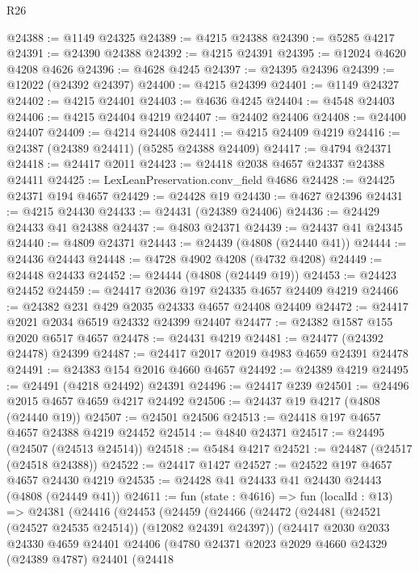 \begin{lexlean}{R26}
\begin{coremodule}
@24388 := @1149 @24325
@24389 := @4215 @24388
@24390 := @5285 @4217
@24391 := @24390 @24388
@24392 := @4215 @24391
@24395 := @12024 @4620 @4208 @4626
@24396 := @4628 @4245
@24397 := @24395 @24396
@24399 := @12022 (@24392 @24397)
@24400 := @4215 @24399
@24401 := @1149 @24327
@24402 := @4215 @24401
@24403 := @4636 @4245
@24404 := @4548 @24403
@24406 := @4215 @24404 @4219
@24407 := @24402 @24406
@24408 := @24400 @24407
@24409 := @4214 @24408
@24411 := @4215 @24409 @4219
@24416 := @24387 (@24389 @24411) (@5285 @24388 @24409)
@24417 := @4794 @24371
@24418 := @24417 @2011
@24423 := @24418 @2038 @4657 @24337 @24388 @24411
@24425 := LexLeanPreservation.conv_field @4686
@24428 := @24425 @24371 @194 @4657
@24429 := @24428 @19
@24430 := @4627 @24396
@24431 := @4215 @24430
@24433 := @24431 (@24389 @24406)
@24436 := @24429 @24433 @41 @24388
@24437 := @4803 @24371
@24439 := @24437 @41 @24345
@24440 := @4809 @24371
@24443 := @24439 (@4808 (@24440 @41))
@24444 := @24436 @24443
@24448 := @4728 @4902 @4208 (@4732 @4208)
@24449 := @24448 @24433
@24452 := @24444 (@4808 (@24449 @19))
@24453 := @24423 @24452
@24459 := @24417 @2036 @197 @24335 @4657 @24409 @4219
@24466 := @24382 @231 @429 @2035 @24333 @4657 @24408 @24409
@24472 := @24417 @2021 @2034 @6519 @24332 @24399 @24407
@24477 := @24382 @1587 @155 @2020 @6517 @4657
@24478 := @24431 @4219
@24481 := @24477 (@24392 @24478) @24399
@24487 := @24417 @2017 @2019 @4983 @4659 @24391 @24478
@24491 := @24383 @154 @2016 @4660 @4657
@24492 := @24389 @4219
@24495 := @24491 (@4218 @24492) @24391
@24496 := @24417 @239
@24501 := @24496 @2015 @4657 @4659 @4217 @24492
@24506 := @24437 @19 @4217 (@4808 (@24440 @19))
@24507 := @24501 @24506
@24513 := @24418 @197 @4657 @4657 @24388 @4219 @24452
@24514 := @4840 @24371
@24517 := @24495 (@24507 (@24513 @24514))
@24518 := @5484 @4217
@24521 := @24487 (@24517 (@24518 @24388))
@24522 := @24417 @1427
@24527 := @24522 @197 @4657 @4657 @24430 @4219
@24535 := @24428 @41 @24433 @41 @24430 @24443 (@4808 (@24449 @41))
@24611 := fun (state : @4616) =>
  fun (localId : @13) =>
  @24381
    (@24416
      (@24453
        (@24459
          (@24466
            (@24472
              (@24481 (@24521 (@24527 @24535 @24514)) (@12082 @24391 @24397))
              (@24417
                @2030
                @2033
                @24330
                @4659
                @24401
                @24406
                (@4780
                  @24371
                  @2023
                  @2029
                  @4660
                  @24329
                  (@24389 @4787)
                  @24401
                  (@24418

\end{coremodule}
\end{lexlean}
